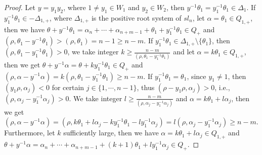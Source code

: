 \documentclass[10pt,a4paper]{amsart}
\begin{document}
\begin{proof}
Let $y=y_1y_2$, where $1\ne y_1\in W_1$ and $y_2\in W_2$, then $y^{-1}\theta_1=y_1^{-1}\theta_1\in \Delta_1$.
If $y_1^{-1}\theta_1\in -\Delta_{1,+}$,
where $\Delta_{1,+}$ is the positive root system of $sl_n$,
let $\alpha=\theta_1\in Q_{1,+}$,
then we have $\theta+y^{-1}\theta_1=\alpha_n+\cdots+\alpha_{n+m-1}+\theta_1+y_1^{-1}\theta_1\in Q_+$ and
$(\rho,\theta_1-y^{-1}\theta_1)>(\rho,\theta_1)=n-1\geq n-m$.
If $y_1^{-1}\theta_1\in \Delta_{1,+}\setminus\{\theta_1\}$,
then $(\rho,\theta_1-y_1^{-1}\theta_1)>0$,
we take integer $k\geq\frac{n-m}{(\rho,\theta_1-y_1^{-1}\theta_1)}$ and let $\alpha=k\theta_1\in Q_{1,+}$,
then we get $\theta+y^{-1}\alpha=\theta+ky_1^{-1}\theta_1\in Q_+$ and
$(\rho,\alpha-y^{-1}\alpha)=k(\rho,\theta_1-y_1^{-1}\theta_1)\geq n-m$.
If $y_1^{-1}\theta_1=\theta_1$, since $y_1\ne1$, then $(y_1\rho, \alpha_j)<0$ for certain $j\in\{1,\cdots,n-1\}$,
thus $(\rho-y_1\rho, \alpha_j)>0$, i.e., $(\rho,\alpha_j-y_1^{-1}\alpha_j)>0$.
We take integer $l\geq\frac{n-m}{(\rho,\alpha_j-y_1^{-1}\alpha_j)}$ and $\alpha=k\theta_1+l\alpha_j$,
then we get $(\rho,\alpha-y^{-1}\alpha)=(\rho,k\theta_1+l\alpha_j-ky_1^{-1}\theta_1-ly_1^{-1}\alpha_j)=l(\rho,\alpha_j-y_1^{-1}\alpha_j)\geq n-m$.
Furthermore, let $k$ sufficiently large, then we have $\alpha=k\theta_1+l\alpha_j\in Q_{1,+}$ and
$\theta+y^{-1}\alpha=\alpha_n+\cdots+\alpha_{n+m-1}+(k+1)\theta_1+ly_1^{-1}\alpha_j\in Q_+$.
\end{proof}
\end{document}
